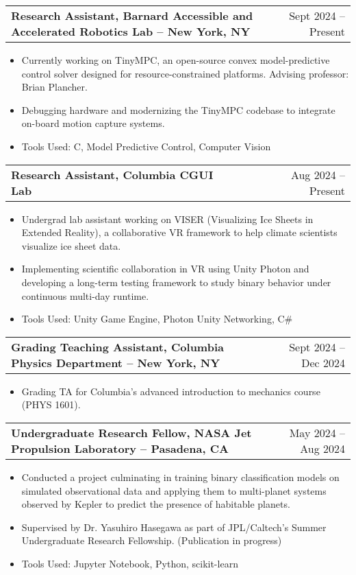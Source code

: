 \documentclass[a4paper,12pt]{article}
\makeatletter
\newenvironment{joblong}[2]
    {
    \begin{tabularx}{\linewidth}{@{}l X r@{}}
    \textbf{#1} & \hfill &  #2 \\[3.75pt]
    \end{tabularx}
    \begin{minipage}[t]{\linewidth}
    \begin{itemize}[nosep,after=\strut, leftmargin=1em, itemsep=3pt,label=--]
    }
    {
    \end{itemize}
    \end{minipage}    
    }
\makeatother
\begin{document}
\begin{joblong}{Research Assistant, Barnard Accessible and Accelerated Robotics Lab -- New York, NY}{Sept 2024 -- Present}
\item Currently working on TinyMPC, an open-source convex model-predictive control solver designed for resource-constrained platforms. Advising professor: Brian Plancher.
\item Debugging hardware and modernizing the TinyMPC codebase to integrate on-board motion capture systems.
\item Tools Used: C, Model Predictive Control, Computer Vision
\end{joblong}

\begin{joblong}{Research Assistant, Columbia CGUI Lab}{Aug 2024 -- Present}
\item Undergrad lab assistant working on VISER (Visualizing Ice Sheets in Extended Reality), a collaborative VR framework to help climate scientists visualize ice sheet data.
\item Implementing scientific collaboration in VR using Unity Photon and developing a long-term testing framework to study binary behavior under continuous multi-day runtime.
\item Tools Used: Unity Game Engine, Photon Unity Networking, C\#
\end{joblong}

\begin{joblong}{Grading Teaching Assistant, Columbia Physics Department -- New York, NY}{Sept 2024 -- Dec 2024}
\item Grading TA for Columbia's advanced introduction to mechanics course (PHYS 1601).
\end{joblong}

\begin{joblong}{Undergraduate Research Fellow, NASA Jet Propulsion Laboratory -- Pasadena, CA}{May 2024 -- Aug 2024}
\item Conducted a project culminating in training binary classification models on simulated observational data and applying them to multi-planet systems observed by Kepler to predict the presence of habitable planets.
\item Supervised by Dr. Yasuhiro Hasegawa as part of JPL/Caltech's Summer Undergraduate Research Fellowship. (Publication in progress)
\item Tools Used: Jupyter Notebook, Python, scikit-learn
\end{joblong}
\end{document}
